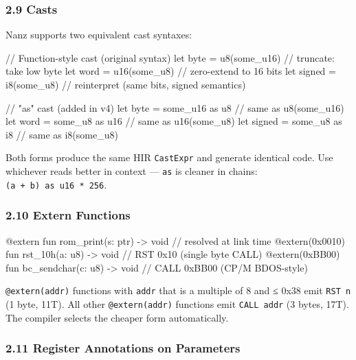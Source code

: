 \documentclass[
  11pt,
  a4paper,
]{report}
\newenvironment{Shaded}{\begin{snugshade}\small}{\end{snugshade}}
\newcommand{\NormalTok}[1]{#1}
\begin{document}
\subsubsection{2.9 Casts}\label{casts}

Nanz supports two equivalent cast syntaxes:

\begin{Shaded}
\begin{Highlighting}[]
\NormalTok{// Function{-}style cast (original syntax)}
\NormalTok{let byte = u8(some\_u16)     // truncate: take low byte}
\NormalTok{let word = u16(some\_u8)     // zero{-}extend to 16 bits}
\NormalTok{let signed = i8(some\_u8)    // reinterpret (same bits, signed semantics)}

\NormalTok{// "as" cast (added in v4)}
\NormalTok{let byte = some\_u16 as u8   // same as u8(some\_u16)}
\NormalTok{let word = some\_u8 as u16   // same as u16(some\_u8)}
\NormalTok{let signed = some\_u8 as i8  // same as i8(some\_u8)}
\end{Highlighting}
\end{Shaded}

Both forms produce the same HIR \texttt{CastExpr} and generate identical
code. Use whichever reads better in context --- \texttt{as} is cleaner
in chains: \texttt{(a\ +\ b)\ as\ u16\ *\ 256}.

\subsubsection{2.10 Extern Functions}\label{extern-functions}

\begin{Shaded}
\begin{Highlighting}[]
\NormalTok{@extern fun rom\_print(s: ptr) {-}\textgreater{} void           // resolved at link time}
\NormalTok{@extern(0x0010) fun rst\_10h(a: u8) {-}\textgreater{} void      // RST 0x10 (single byte CALL)}
\NormalTok{@extern(0xBB00) fun bc\_sendchar(c: u8) {-}\textgreater{} void  // CALL 0xBB00 (CP/M BDOS{-}style)}
\end{Highlighting}
\end{Shaded}

\texttt{@extern(addr)} functions with \texttt{addr} that is a multiple
of 8 and ≤ 0x38 emit \texttt{RST\ n} (1 byte, 11T). All other
\texttt{@extern(addr)} functions emit \texttt{CALL\ addr} (3 bytes,
17T). The compiler selects the cheaper form automatically.

\subsubsection{2.11 Register Annotations on
Parameters}\label{register-annotations-on-parameters}
\end{document}

